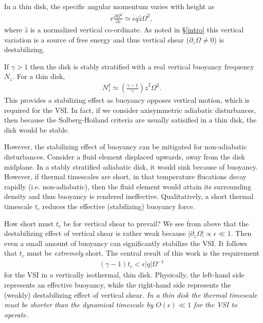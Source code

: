 \documentclass[iop]{emulateapj}
\newcommand{\p}{\partial}
\begin{document}
In a thin disk, the specific angular momentum varies with height as 
\begin{align}\label{vshear_thin}
  r \frac{\p \Omega^2 }{\p z} \simeq \epsilon q \hat{z} \Omega^2,
\end{align}
where $\hat{z}$ is a normalized vertical co-ordinate. As noted in
\S\ref{intro} this vertical variation is a source of free energy and
thus vertical shear ($\p_z\Omega \neq0$) is destabilizing. 

If $\gamma>1$ then the disk is stably stratified with a real vertical
buoyancy frequency $N_z$.  For a thin disk,     
\begin{align}\label{nz_thin}
  N_z^2 \simeq \left(\frac{\gamma-1}{\gamma}\right) \hat{z}^2
  \Omega^2.  
\end{align}
This provides a stabilizing effect as buoyancy opposes vertical
motion, which is required for the VSI. In fact, if we consider
axisymmetric adiabatic disturbances, then because the 
Solberg-Hoiland criteria \citep{tassoul78} are usually satisified in a
thin disk, the disk would be stable. 

However, the stabilizing effect of buoyancy can be mitigated for
non-adiabatic disturbances. Consider a fluid element displaced upwards, away from
the disk midplane. In a stably stratified adiabatic disk, it would
sink because of buoyancy. However, if thermal timescales are short, in
that temperature flucations decay rapidly (i.e. non-adiabatic), then
the fluid element would attain its surrounding density and 
thus buoyancy is rendered ineffective. Qualitatively, a short thermal
timescale $t_c$ reduces the effective (stabilizing) buoyancy force.    

How short must $t_c$ be for vertical shear to prevail? We see
from above that the destabilizing effect of vertical shear is rather
weak because $|\p_z\Omega|\propto \epsilon \ll 1$. 
Then even a small amount of buoyancy can significantly stabilize
the VSI. It follows that $t_c$ must be \emph{extremely} short. The
central result of this work is the requirement 
\begin{align}\label{prelim_bcrit}
  (\gamma - 1)t_c < \epsilon |q| \Omega^{-1}
\end{align}   
for the VSI in a vertically isothermal, thin disk. Physically, the  
left-hand side represents an effective buoyancy, while the right-hand
side represents the (weakly)  destabilizing effect of vertical
shear. \emph{In a thin disk the thermal timescale must be shorter than
  the dynamical timescale by $O(\epsilon)\ll 1$ for the VSI to operate.}  
\end{document}
